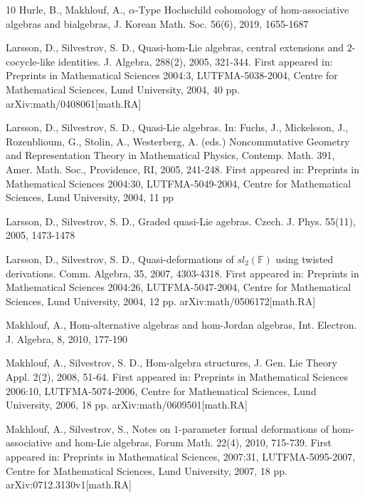 \documentclass[12pt]{article}
\begin{document}
\begin{thebibliography}{10}
			 Hurle, B., Makhlouf, A., $\alpha$-Type Hochschild cohomology of hom-associative algebras and bialgebras, J. Korean Math. Soc. 56(6), 2019, 1655-1687
			
			Larsson, D., Silvestrov, S. D., Quasi-hom-Lie algebras, central extensions and $2$-cocycle-like identities. J. Algebra, {288}(2), 2005, 321-344.
			First appeared in: Preprints in Mathematical Sciences 2004:3, LUTFMA-5038-2004, Centre for Mathematical Sciences, Lund University, 2004, 40 pp. arXiv:math/0408061[math.RA]
			
			 Larsson, D., Silvestrov, S. D., Quasi-Lie algebras. In: Fuchs, J., Mickelsson, J., Rozenblioum, G., Stolin, A., Westerberg, A. (eds.) Noncommutative Geometry and Representation Theory in Mathematical Physics, Contemp. Math. {391}, Amer. Math. Soc., Providence, RI, 2005, 241-248.
			First appeared in: Preprints in Mathematical Sciences 2004:30, LUTFMA-5049-2004, Centre for Mathematical Sciences, Lund University, 2004, 11 pp
			
			Larsson, D., Silvestrov, S. D., Graded quasi-Lie agebras. Czech. J. Phys. {55}(11), 2005, 1473-1478
			
			Larsson, D., Silvestrov, S. D., Quasi-deformations of $sl_2(\mathbb{F})$ using twisted deri\-vations. Comm. Algebra, {35}, 2007, 4303-4318.
			First appeared in: Preprints in Mathematical Sciences 2004:26, LUTFMA-5047-2004, Centre for Mathematical Sciences, Lund University, 2004, 12 pp. arXiv:math/0506172[math.RA]
			
			  Makhlouf, A., Hom-alternative algebras and hom-Jordan algebras, Int. Electron. J. Algebra, 8, 2010, 177-190
			
			Makhlouf, A., Silvestrov, S. D., Hom-algebra structures,
			J. Gen. Lie Theory Appl. {2}(2), 2008, 51-64.
			First appeared in: Preprints in Mathematical Sciences  2006:10, LUTFMA-5074-2006, Centre for Mathematical Sciences, Lund University, 2006, 18 pp. arXiv:math/0609501[math.RA]
			
			Makhlouf, A., Silvestrov, S.,
			Notes on $1$-parameter formal deformations of hom-associative and hom-Lie algebras, Forum Math. {22}(4), 2010, 715-739.
			First appeared in: Preprints in Mathematical Sciences, 2007:31, LUTFMA-5095-2007, Centre for Mathematical Sciences, Lund University, 2007, 18 pp.  arXiv:0712.3130v1[math.RA]
			

\end{thebibliography}
\end{document}
